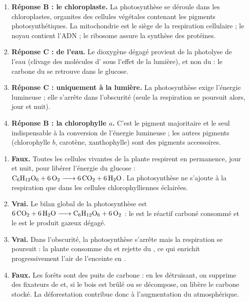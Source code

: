 \documentclass[11pt]{article}
\begin{document}
\begin{corrige}
\begin{enumerate}
\item \textbf{Réponse B : le chloroplaste.} La photosynthèse se déroule dans les chloroplastes, organites des cellules végétales contenant les pigments photosynthétiques. La mitochondrie est le siège de la respiration cellulaire ; le noyau contient l'ADN ; le ribosome assure la synthèse des protéines.
\item \textbf{Réponse C : de l'eau.} Le dioxygène dégagé provient de la photolyse de l'eau (clivage des molécules d' sous l'effet de la lumière), et non du  : le carbone du  se retrouve dans le glucose.
\item \textbf{Réponse C : uniquement à la lumière.} La photosynthèse exige l'énergie lumineuse ; elle s'arrête dans l'obscurité (seule la respiration se poursuit alors, jour et nuit).
\item \textbf{Réponse B : la chlorophylle $a$.} C'est le pigment majoritaire et le seul indispensable à la conversion de l'énergie lumineuse ; les autres pigments (chlorophylle $b$, carotène, xanthophylle) sont des pigments accessoires.
\end{enumerate}
\end{corrige}

\begin{corrige}
\begin{enumerate}
\item \textbf{Faux.} Toutes les cellules vivantes de la plante respirent en permanence, jour et nuit, pour libérer l'énergie du glucose : $\ce{C6H12O6 + 6O2 -> 6CO2 + 6H2O}$. La photosynthèse ne s'ajoute à la respiration que dans les cellules chlorophylliennes éclairées.
\item \textbf{Vrai.} Le bilan global de la photosynthèse est $\ce{6CO2 + 6H2O -> C6H12O6 + 6O2}$ : le  est le réactif carboné consommé et le  est le produit gazeux dégagé.
\item \textbf{Vrai.} Dans l'obscurité, la photosynthèse s'arrête mais la respiration se poursuit : la plante consomme du  et rejette du , ce qui enrichit progressivement l'air de l'enceinte en .
\item \textbf{Faux.} Les forêts sont des puits de carbone : en les détruisant, on supprime des fixateurs de  et, si le bois est brûlé ou se décompose, on libère le carbone stocké. La déforestation contribue donc à l'augmentation du  atmosphérique.
\end{enumerate}
\end{corrige}
\end{document}
